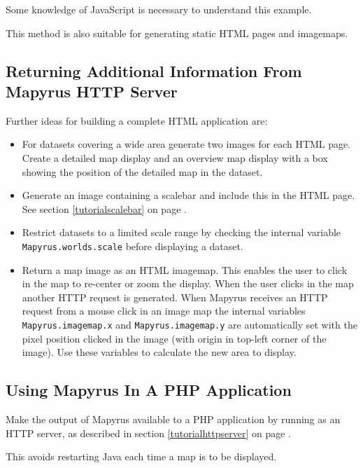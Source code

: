 Some knowledge of JavaScript is necessary to understand this example.

This method is also suitable for generating static HTML pages
and imagemaps.

\subsection{Returning Additional Information From Mapyrus HTTP Server}

Further ideas for building a complete HTML application are:

\begin{itemize}
\item
For datasets covering a wide area generate two images for
each HTML page.  Create a detailed map display and an overview map display
with a box showing the position of the detailed map in the dataset.

\item
Generate an image containing a scalebar
and include this in the HTML page.  See section \ref{tutorialscalebar}
on page \pageref{tutorialscalebar}.

\item
Restrict datasets to a limited scale range by checking the
internal variable
\texttt{Mapyrus.worlds.scale} before displaying a dataset.

\item
Return a map image as an HTML imagemap.  This enables the user to click
in the map to re-center or zoom the display.  When the user clicks
in the map another HTTP request is generated.  When Mapyrus receives
an HTTP request from a mouse click in an image map the internal variables
\texttt{Mapyrus.imagemap.x} and
\texttt{Mapyrus.imagemap.y} are automatically set with the pixel position
clicked in the image (with origin in top-left corner of the image).
Use these variables to calculate the new area to display.
\end{itemize}

\subsection{Using Mapyrus In A PHP Application}

Make the output of Mapyrus available to a PHP application by running as an
HTTP server, as described in section \ref{tutorialhttpserver}
on page \pageref{tutorialhttpserver}.

This avoids restarting Java each time a map is to be displayed.

